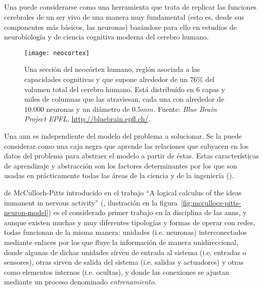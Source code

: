 \subsection{}

Una  puede considerarse como una herramienta que trata de replicar las funciones cerebrales de un ser vivo de una manera muy fundamental (esto es, desde sus componentes más básicos, las neuronas) basándose para ello en estudios de neurobiología y de ciencia cognitiva moderna del cerebro humano.

\begin{figure}
	\texttt{[image: neocortex]}
	\caption{Una sección del neocórtex humano, región asociada a las capacidades cognitivas y que supone alrededor de un $76\%$ del volumen total del cerebro humano. Está distribuído en $6$ capas y miles de columnas que las atraviesan, cada una con alrededor de $10.000$ neuronas y un diámetro de $0.5mm$. Fuente: \textit{Blue Brain Project EPFL}, \url{http://bluebrain.epfl.ch/}.}
	\label{fig:neocortex}
\end{figure}

Una \ac{ann} es independiente del modelo del problema a solucionar. Se la puede considerar como una caja negra que aprende las relaciones que subyacen en los datos del problema para abstraer el modelo a partir de éstas. Estas características de aprendizaje y abstracción son los factores determinantes por los que son usadas en prácticamente todas las áreas de la ciencia y de la ingeniería (\cite{Du2006}).

 de McCulloch-Pitts introducido en el trabajo \enquote{A logical calculus of the ideas immanent in nervous activity} (\cite{McCulloch1943}, ilustración en la figura~\ref{fig:mccullocs-pitts-neuron-model}) es el considerado primer trabajo en la disciplina de las \acp{ann}, y aunque existen muchas y muy diferentes tipologías y formas de operar con redes, todas funcionan de la misma manera: unidades (i.e. neuronas) interconectados mediante enlaces por los que fluye la información de manera unidireccional, donde algunas de dichas unidades sirven de entrada al sistema (i.e. entradas o sensores), otras sirven de salida del sistema (i.e. salidas y actuadores) y otras como elementos internos (i.e. ocultas), y donde las conexiones se ajustan mediante un proceso denominado \textit{entrenamiento}.

